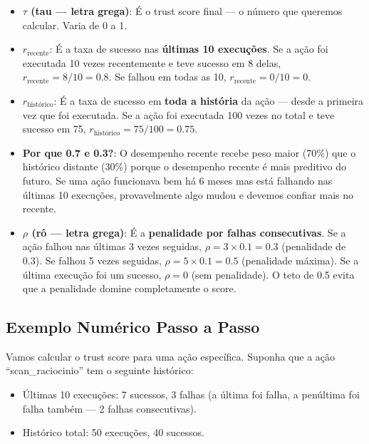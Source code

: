 \begin{itemize}
    \item \textbf{$\tau$ (tau — letra grega)}: É o trust score final — o número que queremos calcular. Varia de 0 a 1.
    
    \item \textbf{$r_{\text{recente}}$}: É a taxa de sucesso nas \textbf{últimas 10 execuções}. Se a ação foi executada 10 vezes recentemente e teve sucesso em 8 delas, $r_{\text{recente}} = 8/10 = 0.8$. Se falhou em todas as 10, $r_{\text{recente}} = 0/10 = 0$.
    
    \item \textbf{$r_{\text{histórico}}$}: É a taxa de sucesso em \textbf{toda a história} da ação — desde a primeira vez que foi executada. Se a ação foi executada 100 vezes no total e teve sucesso em 75, $r_{\text{histórico}} = 75/100 = 0.75$.
    
    \item \textbf{Por que 0.7 e 0.3?}: O desempenho recente recebe peso maior (70\%) que o histórico distante (30\%) porque o desempenho recente é mais preditivo do futuro. Se uma ação funcionava bem há 6 meses mas está falhando nas últimas 10 execuções, provavelmente algo mudou e devemos confiar mais no recente.
    
    \item \textbf{$\rho$ (rô — letra grega)}: É a \textbf{penalidade por falhas consecutivas}. Se a ação falhou nas últimas 3 vezes seguidas, $\rho = 3 \times 0.1 = 0.3$ (penalidade de 0.3). Se falhou 5 vezes seguidas, $\rho = 5 \times 0.1 = 0.5$ (penalidade máxima). Se a última execução foi um sucesso, $\rho = 0$ (sem penalidade). O teto de 0.5 evita que a penalidade domine completamente o score.
\end{itemize}

\subsection{Exemplo Numérico Passo a Passo}

Vamos calcular o trust score para uma ação específica. Suponha que a ação ``scan\_raciocinio'' tem o seguinte histórico:

\begin{itemize}
    \item Últimas 10 execuções: 7 sucessos, 3 falhas (a última foi falha, a penúltima foi falha também — 2 falhas consecutivas).
    \item Histórico total: 50 execuções, 40 sucessos.
\end{itemize}

